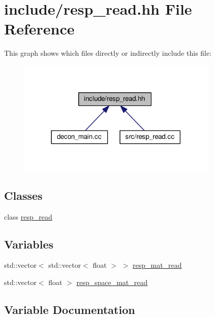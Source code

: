 \hypertarget{resp__read_8hh}{}\section{include/resp\+\_\+read.hh File Reference}
\label{resp__read_8hh}
This graph shows which files directly or indirectly include this file\+:
\nopagebreak
\begin{figure}[H]
\begin{center}
\leavevmode
\includegraphics[width=270pt]{resp__read_8hh__dep__incl}
\end{center}
\end{figure}
\subsection*{Classes}
\begin{DoxyCompactItemize}
\item 
class \mbox{\hyperlink{classresp__read}{resp\+\_\+read}}
\end{DoxyCompactItemize}
\subsection*{Variables}
\begin{DoxyCompactItemize}
\item 
std\+::vector$<$ std\+::vector$<$ float $>$ $>$ \mbox{\hyperlink{resp__read_8hh_a1576c0eb61bce8dc9a09e20cbf5827f7}{resp\+\_\+mat\+\_\+read}}
\item 
std\+::vector$<$ float $>$ \mbox{\hyperlink{resp__read_8hh_a442adefcbd178422c9eedf7ba7860f9b}{resp\+\_\+space\+\_\+mat\+\_\+read}}
\end{DoxyCompactItemize}


\subsection{Variable Documentation}
\mbox{\label{resp__read_8hh_a1576c0eb61bce8dc9a09e20cbf5827f7}} 
